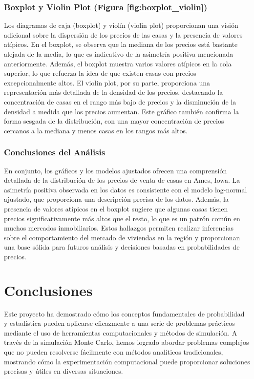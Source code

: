 \documentclass[12pt]{article}
\begin{document}
\subsubsection{Boxplot y Violin Plot (Figura \ref{fig:boxplot_violin})}
Los diagramas de caja (boxplot) y violín (violin plot) proporcionan una visión adicional sobre la dispersión de los precios de las casas y la presencia de valores atípicos. En el boxplot, se observa que la mediana de los precios está bastante alejada de la media, lo que es indicativo de la asimetría positiva mencionada anteriormente. Además, el boxplot muestra varios valores atípicos en la cola superior, lo que refuerza la idea de que existen casas con precios excepcionalmente altos. El violin plot, por su parte, proporciona una representación más detallada de la densidad de los precios, destacando la concentración de casas en el rango más bajo de precios y la disminución de la densidad a medida que los precios aumentan. Este gráfico también confirma la forma sesgada de la distribución, con una mayor concentración de precios cercanos a la mediana y menos casas en los rangos más altos.

\subsubsection{Conclusiones del Análisis}
En conjunto, los gráficos y los modelos ajustados ofrecen una comprensión detallada de la distribución de los precios de venta de casas en Ames, Iowa. La asimetría positiva observada en los datos es consistente con el modelo log-normal ajustado, que proporciona una descripción precisa de los datos. Además, la presencia de valores atípicos en el boxplot sugiere que algunas casas tienen precios significativamente más altos que el resto, lo que es un patrón común en muchos mercados inmobiliarios. Estos hallazgos permiten realizar inferencias sobre el comportamiento del mercado de viviendas en la región y proporcionan una base sólida para futuros análisis y decisiones basadas en probabilidades de precios.


\section{Conclusiones}

Este proyecto ha demostrado cómo los conceptos fundamentales de probabilidad y estadística pueden aplicarse eficazmente a una serie de problemas prácticos mediante el uso de herramientas computacionales y métodos de simulación. A través de la simulación Monte Carlo, hemos logrado abordar problemas complejos que no pueden resolverse fácilmente con métodos analíticos tradicionales, mostrando cómo la experimentación computacional puede proporcionar soluciones precisas y útiles en diversas situaciones.
\end{document}
